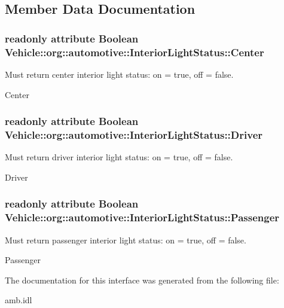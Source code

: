 \subsection{Member Data Documentation}
\hypertarget{interfaceVehicle_1_1org_1_1automotive_1_1InteriorLightStatus_a65621027e7b993a02569f0e4ace51aff}{
\subsubsection[{Center}]{\setlength{\rightskip}{0pt plus 5cm}readonly attribute Boolean Vehicle\-::org\-::automotive\-::\-Interior\-Light\-Status\-::\-Center}}\label{interfaceVehicle_1_1org_1_1automotive_1_1InteriorLightStatus_a65621027e7b993a02569f0e4ace51aff}


Must return center interior light status\-: on = true, off = false. 

Center \hypertarget{interfaceVehicle_1_1org_1_1automotive_1_1InteriorLightStatus_a9be258cd372a083798606ff38756e2c4}{
\subsubsection[{Driver}]{\setlength{\rightskip}{0pt plus 5cm}readonly attribute Boolean Vehicle\-::org\-::automotive\-::\-Interior\-Light\-Status\-::\-Driver}}\label{interfaceVehicle_1_1org_1_1automotive_1_1InteriorLightStatus_a9be258cd372a083798606ff38756e2c4}


Must return driver interior light status\-: on = true, off = false. 

Driver \hypertarget{interfaceVehicle_1_1org_1_1automotive_1_1InteriorLightStatus_a0cca15fc296c535779d6ce938435ab9e}{
\subsubsection[{Passenger}]{\setlength{\rightskip}{0pt plus 5cm}readonly attribute Boolean Vehicle\-::org\-::automotive\-::\-Interior\-Light\-Status\-::\-Passenger}}\label{interfaceVehicle_1_1org_1_1automotive_1_1InteriorLightStatus_a0cca15fc296c535779d6ce938435ab9e}


Must return passenger interior light status\-: on = true, off = false. 

Passenger 

The documentation for this interface was generated from the following file\-:\begin{DoxyCompactItemize}
\item 
amb.\-idl\end{DoxyCompactItemize}
